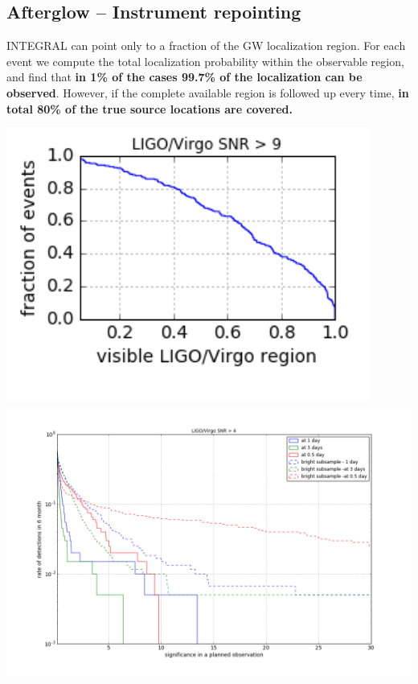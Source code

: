 \documentclass[a0,portrait]{a0poster}
\renewcommand{\emph}[1]{\textbf{\color{blue}#1}}
\begin{document}
\begin{multicols}{2}
\subsection*{Afterglow -- Instrument repointing}

INTEGRAL can point only to a fraction of the GW localization region. For each
event we compute the total localization probability within the observable
region, and find that \emph{in 1\% of the cases 99.7\% of the localization can be
observed}. However, if the complete available region is followed up every
time, \emph{in total 80\% of the true source locations are covered.}

\begin{center}
  \includegraphics[height=9cm]{figures/covered_region_9_-1_normed.png}
  \includegraphics[height=9cm]{figures/significance_vs_rate_af.png}
\vspace*{-1.5cm}
    \label{covered_region}
\end{center}


\end{multicols}
\end{document}
